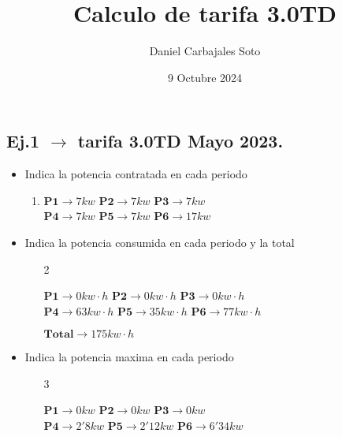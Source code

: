 \documentclass[13pt]{article}
\author{Daniel Carbajales Soto}
\title{Calculo de tarifa 3.0TD}
\date{9 Octubre 2024}
\begin{document}
\maketitle


\begin{flushleft}
\section{Ej.1 $\to$ tarifa 3.0TD Mayo 2023.}
\begin{itemize}
  
  \item Indica la potencia contratada en cada periodo 
  \begin{enumerate}
    \item\begin{flushleft}
      \(\mathbf{P1}\to 7kw\) \hfill \(\mathbf{P2}\to 7kw\) \hfill \(\mathbf{P3}\to 7kw\) \hfill  
      \\  
      \(\mathbf{P4}\to 7kw\) \hfill \(\mathbf{P5}\to 7kw\) \hfill \(\mathbf{P6}\to 17kw\)
    \end{flushleft}
\end{enumerate}

  \item Indica la potencia  consumida en cada periodo y la total
    \begin{enumerate}
      \item[2]\begin{flushleft}
      \(\mathbf{P1}\to 0kw\cdot h\) \hfill \(\mathbf{P2}\to 0kw\cdot h\) \hfill \(\mathbf{P3}\to 0kw\cdot h\) \hfill  
      \\  
      \(\mathbf{P4}\to 63kw\cdot h\) \hfill \(\mathbf{P5}\to 35kw\cdot h\) \hfill \(\mathbf{P6}\to 77kw\cdot h\)
      \\
      \begin{flushright}
        \(\mathbf{Total}\to 175kw\cdot h\)
      \end{flushright}
    \end{flushleft}
\end{enumerate}
  \item Indica la potencia maxima en cada periodo   
    \begin{enumerate}
      \item[3]\begin{flushleft}
      \(\mathbf{P1}\to 0kw\) \hfill \(\mathbf{P2}\to 0kw\) \hfill\(\mathbf{P3}\to 0kw\) \hfill
      \\  
      \(\mathbf{P4}\to 2'8kw\) \hfill \(\mathbf{P5}\to 2'12kw\) \hfill\(\mathbf{P6}\to 6'34kw\) \hfill
      \\
    \end{flushleft}
\end{enumerate}


\end{itemize}
\end{flushleft}
\end{document}
